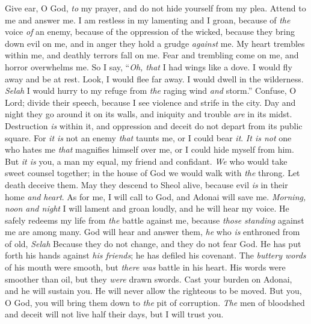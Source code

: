 \begin{biblechapter} %
 Give ear, O God, \textit{to} my prayer, 
and do not hide yourself from my plea.
\verse Attend to me and answer me. 
I am restless in my lamenting and I groan,
\verse because of \textit{the} voice \textit{of} an enemy, 
because of the oppression of the wicked, 
because they bring down evil on me, 
and in anger they hold a grudge \textit{against} me.
\verse My heart trembles within me, 
and deathly terrors fall on me.
\verse Fear and trembling come on me, 
and horror overwhelms me.
\verse So I say, “\textit{Oh, that} I had wings like a dove. 
I would fly away and be at rest.
\verse Look, I would flee far away. 
I would dwell in the wilderness. \textit{Selah}
\verse I would hurry to my refuge 
from \textit{the} raging wind \textit{and} storm.”
\verse Confuse, O Lord; divide their speech, 
because I see violence and strife in the city.
\verse Day and night they go around it on its walls, 
and iniquity and trouble \textit{are} in its midst.
\verse Destruction \textit{is} within it, 
and oppression and deceit 
do not depart from its public square.
\verse For \textit{it is} not an enemy \textit{that} taunts me, 
or I could bear \textit{it}. 
\textit{It is not} one who hates me \textit{that} magnifies himself over me, 
or I could hide myself from him.
\verse But \textit{it is} you, a man my equal, 
my friend and confidant.
\verse \textit{We} who would take sweet counsel together; 
in the house of God 
we would walk with \textit{the} throng.
\verse Let death deceive them. May they descend to Sheol alive, 
because evil \textit{is} in their home \textit{and} \textit{heart}.
\verse As for me, I will call to God, 
and Adonai will save me.
\verse \textit{Morning, noon and night} I will lament and groan loudly, 
and he will hear my voice.
\verse He safely redeems my life from \textit{the} battle against me, 
because \textit{those standing} against me are among many.
\verse God will hear and answer them, 
\textit{he} who \textit{is} enthroned from of old, \textit{Selah} 
Because they do not change, 
and they do not fear God.
\verse He has put forth his hands against \textit{his friends}; 
he has defiled his covenant.
\verse The \textit{buttery words} of his mouth were smooth, 
but \textit{there was} battle in his heart. 
His words were smoother than oil, 
but they \textit{were} drawn swords.
\verse Cast your burden on Adonai, 
and he will sustain you. 
He will never allow the righteous to be moved.
\verse But you, O God, you will bring them down to \textit{the} pit of corruption. 
\textit{The} men of bloodshed and deceit will not live half their days, 
but I will trust you.
\end{biblechapter}

